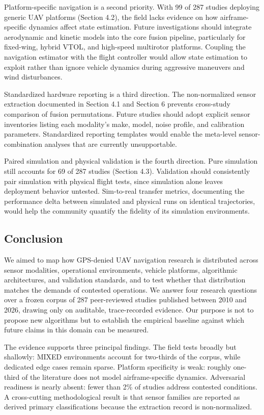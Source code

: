 \documentclass[conference]{IEEEtran}
\begin{document}
Platform-specific navigation is a second priority. With 99 of 287 studies deploying generic UAV platforms (Section 4.2), the field lacks evidence on how airframe-specific dynamics affect state estimation. Future investigations should integrate aerodynamic and kinetic models into the core fusion pipeline, particularly for fixed-wing, hybrid VTOL, and high-speed multirotor platforms. Coupling the navigation estimator with the flight controller would allow state estimation to exploit rather than ignore vehicle dynamics during aggressive maneuvers and wind disturbances.


Standardized hardware reporting is a third direction. The non-normalized sensor extraction documented in Section 4.1 and Section 6 prevents cross-study comparison of fusion permutations. Future studies should adopt explicit sensor inventories listing each modality's make, model, noise profile, and calibration parameters. Standardized reporting templates would enable the meta-level sensor-combination analyses that are currently unsupportable.


Paired simulation and physical validation is the fourth direction. Pure simulation still accounts for 69 of 287 studies (Section 4.3). Validation should consistently pair simulation with physical flight tests, since simulation alone leaves deployment behavior untested. Sim-to-real transfer metrics, documenting the performance delta between simulated and physical runs on identical trajectories, would help the community quantify the fidelity of its simulation environments.


\subsection{Conclusion}


We aimed to map how GPS-denied UAV navigation research is distributed across sensor modalities, operational environments, vehicle platforms, algorithmic architectures, and validation standards, and to test whether that distribution matches the demands of contested operations. We answer four research questions over a frozen corpus of 287 peer-reviewed studies published between 2010 and 2026, drawing only on auditable, trace-recorded evidence. Our purpose is not to propose new algorithms but to establish the empirical baseline against which future claims in this domain can be measured.


The evidence supports three principal findings. The field tests broadly but shallowly: MIXED environments account for two-thirds of the corpus, while dedicated edge cases remain sparse. Platform specificity is weak: roughly one-third of the literature does not model airframe-specific dynamics. Adversarial readiness is nearly absent: fewer than 2\% of studies address contested conditions. A cross-cutting methodological result is that sensor families are reported as derived primary classifications because the extraction record is non-normalized.
\end{document}

